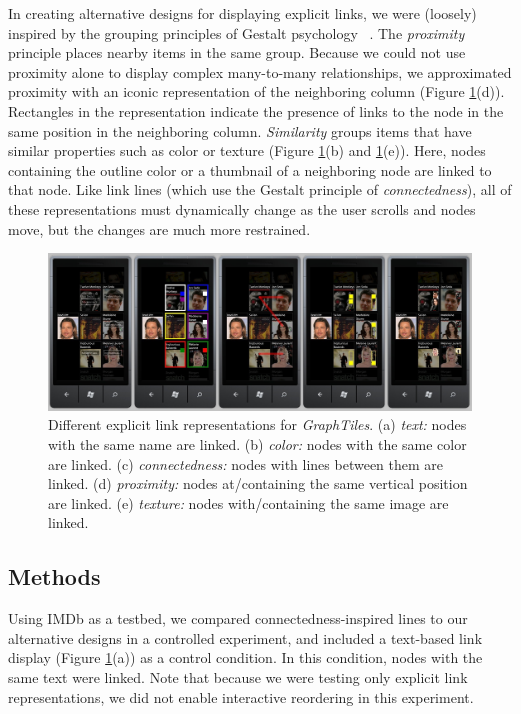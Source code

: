 \documentclass{sigchi}
\begin{document}
In creating alternative designs for displaying explicit links, we were (loosely) inspired by the grouping principles of Gestalt psychology ~\cite{RefWorks:562}. The \textit{proximity} principle places nearby items in the same group. Because we could not use proximity alone to display complex many-to-many relationships, we approximated proximity with an iconic representation of the neighboring column (Figure \ref{fig:linkrep}(d)). Rectangles in the representation indicate the presence of links to the node in the same position in the neighboring column. \textit{Similarity} groups items that have similar properties such as color or texture (Figure \ref{fig:linkrep}(b) and \ref{fig:linkrep}(e)). Here, nodes containing the outline color or a thumbnail of a neighboring node are linked to that node. Like link lines (which use the Gestalt principle of \textit{connectedness}), all of these representations must dynamically change as the user scrolls and nodes move, but the changes are much more restrained.

\begin{figure}[htb!]
\centering
\includegraphics[width=7in]{images/linkrep}
\caption{Different explicit link representations for \textit{GraphTiles}. (a) \emph{text:} nodes with the same name are linked. (b) \emph{color:} nodes with the same color are linked. (c) \emph{connectedness:} nodes with lines between them are linked. (d) \emph{proximity:} nodes at/containing the same vertical position are linked. (e) \emph{texture:} nodes with/containing the same image are linked.}
\label{fig:linkrep}
\end{figure}



\subsection{Methods}

Using IMDb as a testbed, we compared connectedness-inspired lines to our alternative designs in a controlled experiment, and included a text-based link display (Figure \ref{fig:linkrep}(a)) as a control condition. In this condition, nodes with the same text were linked. Note that because we were testing only explicit link representations, we did not enable interactive reordering in this experiment.
\end{document}
